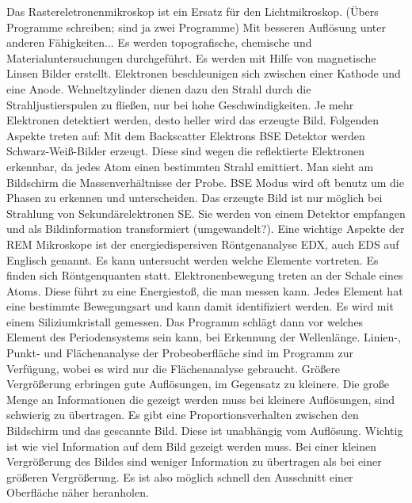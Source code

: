 Das Rastereletronenmikroskop ist ein Ersatz für den Lichtmikroskop. (Übers Programme schreiben; sind ja zwei Programme) Mit besseren Auflösung unter anderen Fähigkeiten... Es werden topografische, chemische und Materialuntersuchungen durchgeführt. Es werden mit Hilfe von magnetische Linsen Bilder erstellt. Elektronen beschleunigen sich zwischen einer Kathode und eine Anode. Wehneltzylinder dienen dazu den Strahl durch die Strahljustierspulen zu fließen, nur bei hohe Geschwindigkeiten. Je mehr Elektronen detektiert werden, desto heller wird das erzeugte Bild.
Folgenden Aspekte treten auf:
Mit dem Backscatter Elektrons BSE Detektor werden Schwarz-Weiß-Bilder erzeugt. Diese sind wegen die reflektierte Elektronen erkennbar, da jedes Atom einen bestimmten Strahl emittiert. Man sieht am Bildschirm die Massenverhältnisse der Probe. BSE Modus wird oft benutz um die Phasen zu erkennen und unterscheiden.
Das erzeugte Bild ist nur möglich bei Strahlung von Sekundärelektronen SE. Sie werden von einem Detektor empfangen und als Bildinformation transformiert (umgewandelt?). 
Eine wichtige Aspekte der REM Mikroskope ist der energiedispersiven Röntgenanalyse EDX, auch EDS auf Englisch genannt. Es kann untersucht werden welche Elemente vortreten. Es finden sich Röntgenquanten statt. Elektronenbewegung treten an der Schale eines Atoms. Diese führt zu eine Energiestoß, die man messen kann. Jedes Element hat eine bestimmte Bewegungsart und kann damit identifiziert werden. Es wird mit einem Siliziumkristall gemessen. Das Programm schlägt dann vor welches Element des Periodensystems sein kann, bei Erkennung der Wellenlänge. 
Linien-, Punkt- und Flächenanalyse der Probeoberfläche sind im Programm zur Verfügung, wobei es wird nur die Flächenanalyse gebraucht. 
Größere Vergrößerung erbringen gute Auflösungen, im Gegensatz zu kleinere. Die große Menge an Informationen die gezeigt werden muss bei kleinere Auflösungen, sind schwierig zu übertragen. Es gibt eine Proportionsverhalten zwischen den Bildschirm und das gescannte Bild. Diese ist unabhängig vom Auflösung. Wichtig ist wie viel Information auf dem Bild gezeigt werden muss.  Bei einer kleinen Vergrößerung des Bildes sind weniger Information zu übertragen als bei einer größeren Vergrößerung. Es ist also möglich schnell den Ausschnitt einer Oberfläche näher heranholen.



